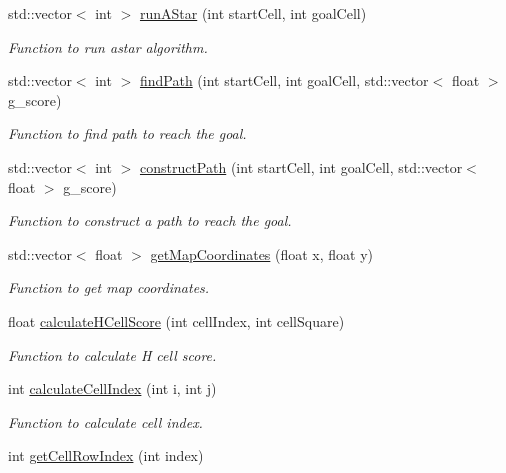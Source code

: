 \begin{DoxyCompactItemize}
std\+::vector$<$ int $>$ \hyperlink{classastar__plugin_1_1_a_star_planner_a70e9cb8c51872dd8f83d1ae4a7006c62}{run\+A\+Star} (int start\+Cell, int goal\+Cell)
\begin{DoxyCompactList}\small\item\em Function to run astar algorithm. \end{DoxyCompactList}\item 
std\+::vector$<$ int $>$ \hyperlink{classastar__plugin_1_1_a_star_planner_a65c23083aa562f0ce8a881d26fb020a7}{find\+Path} (int start\+Cell, int goal\+Cell, std\+::vector$<$ float $>$ g\+\_\+score)
\begin{DoxyCompactList}\small\item\em Function to find path to reach the goal. \end{DoxyCompactList}\item 
std\+::vector$<$ int $>$ \hyperlink{classastar__plugin_1_1_a_star_planner_aae75ccdcf38f6cd848d024a8aebc0bc0}{construct\+Path} (int start\+Cell, int goal\+Cell, std\+::vector$<$ float $>$ g\+\_\+score)
\begin{DoxyCompactList}\small\item\em Function to construct a path to reach the goal. \end{DoxyCompactList}\item 
std\+::vector$<$ float $>$ \hyperlink{classastar__plugin_1_1_a_star_planner_a875990bd4b8b9ab17855ce54b4df4780}{get\+Map\+Coordinates} (float x, float y)
\begin{DoxyCompactList}\small\item\em Function to get map coordinates. \end{DoxyCompactList}\item 
float \hyperlink{classastar__plugin_1_1_a_star_planner_a18fac92699522fa76a2add6ea75fa6fc}{calculate\+H\+Cell\+Score} (int cell\+Index, int cell\+Square)
\begin{DoxyCompactList}\small\item\em Function to calculate H cell score. \end{DoxyCompactList}\item 
int \hyperlink{classastar__plugin_1_1_a_star_planner_aa54d997cd223de69fb7a37a79dc5cd1c}{calculate\+Cell\+Index} (int i, int j)
\begin{DoxyCompactList}\small\item\em Function to calculate cell index. \end{DoxyCompactList}\item 
int \hyperlink{classastar__plugin_1_1_a_star_planner_a660c014cd14a8de3080b138b44f5437e}{get\+Cell\+Row\+Index} (int index)

\end{DoxyCompactItemize}
